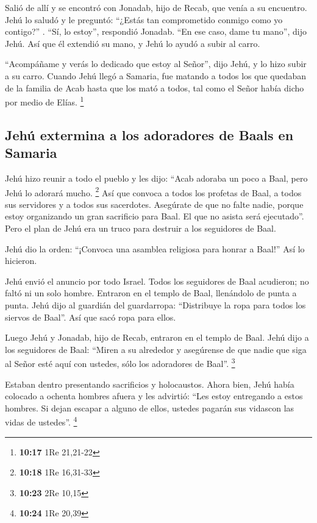  Salió de allí y se encontró con Jonadab, hijo de Recab,
que venía a su encuentro. Jehú lo saludó y le preguntó: ``¿Estás tan
comprometido conmigo como yo contigo?'' . ``Sí, lo estoy'', respondió
Jonadab. ``En ese caso, dame tu mano'', dijo Jehú. Así que él extendió
su mano, y Jehú lo ayudó a subir al carro.

 ``Acompáñame y verás lo dedicado que estoy al Señor'',
dijo Jehú, y lo hizo subir a su carro.  Cuando Jehú llegó
a Samaria, fue matando a todos los que quedaban de la familia de Acab
hasta que los mató a todos, tal como el Señor había dicho por medio de
Elías. \footnote{\textbf{10:17} 1Re 21,21-22}

\hypertarget{jehuxfa-extermina-a-los-adoradores-de-baals-en-samaria}{%
\subsection{Jehú extermina a los adoradores de Baals en
Samaria}\label{jehuxfa-extermina-a-los-adoradores-de-baals-en-samaria}}

 Jehú hizo reunir a todo el pueblo y les dijo: ``Acab
adoraba un poco a Baal, pero Jehú lo adorará mucho. \footnote{\textbf{10:18}
  1Re 16,31-33}  Así que convoca a todos los profetas de
Baal, a todos sus servidores y a todos sus sacerdotes. Asegúrate de que
no falte nadie, porque estoy organizando un gran sacrificio para Baal.
El que no asista será ejecutado''. Pero el plan de Jehú era un truco
para destruir a los seguidores de Baal.

 Jehú dio la orden: ``¡Convoca una asamblea religiosa
para honrar a Baal!'' Así lo hicieron.

 Jehú envió el anuncio por todo Israel. Todos los
seguidores de Baal acudieron; no faltó ni un solo hombre. Entraron en el
templo de Baal, llenándolo de punta a punta.  Jehú dijo
al guardián del guardarropa: ``Distribuye la ropa para todos los siervos
de Baal''. Así que sacó ropa para ellos.

 Luego Jehú y Jonadab, hijo de Recab, entraron en el
templo de Baal. Jehú dijo a los seguidores de Baal: ``Miren a su
alrededor y asegúrense de que nadie que siga al Señor esté aquí con
ustedes, sólo los adoradores de Baal''. \footnote{\textbf{10:23} 2Re
  10,15}

 Estaban dentro presentando sacrificios y holocaustos.
Ahora bien, Jehú había colocado a ochenta hombres afuera y les advirtió:
``Les estoy entregando a estos hombres. Si dejan escapar a alguno de
ellos, ustedes pagarán sus vidascon las vidas de ustedes''. \footnote{\textbf{10:24}
  1Re 20,39}

